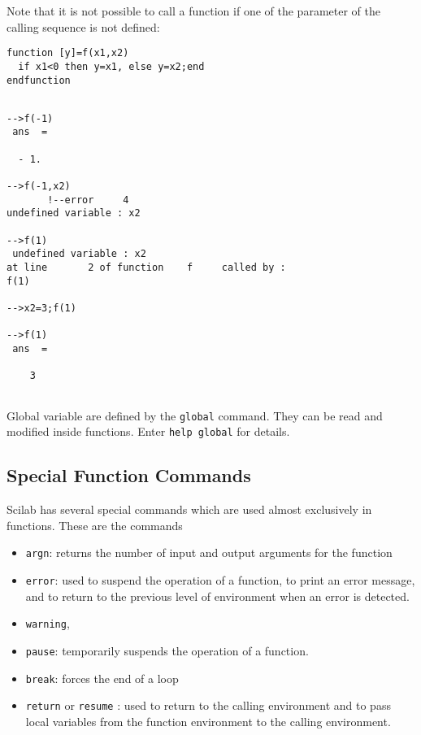 Note that it is not possible to call a function if one of the
parameter of the calling sequence is not defined:

\begin{verbatim}
function [y]=f(x1,x2)
  if x1<0 then y=x1, else y=x2;end
endfunction
\end{verbatim}
\begin{verbatim}

-->f(-1)
 ans  =
 
  - 1.  
 
-->f(-1,x2)
       !--error     4 
undefined variable : x2  

-->f(1)
 undefined variable : x2                      
at line       2 of function    f     called by :  
f(1)

-->x2=3;f(1)

-->f(1)
 ans  =
 
    3
                    
\end{verbatim}

Global variable are defined by the \verb!global! command. They can
be read and modified inside functions. Enter {\tt help global} for
details. 

\subsection{Special Function Commands}
Scilab has several special commands which are used almost exclusively
in functions.  These are the commands 

\begin{itemize}
	\item {\tt argn}: returns the number of input
and output arguments for the function
	\item {\tt error}: used to suspend the 
operation of a function, to print an error message, and to return to the
previous level of environment when an error is detected.  
	\item {\tt warning}, 
	\item {\tt pause}: temporarily suspends the 
operation of a function.
	\item {\tt break}: forces the end of a loop 
	\item {\tt return} or {\tt resume} : used 
to return to the calling environment and to pass local
variables from the function environment to the calling environment.  
\end{itemize}

